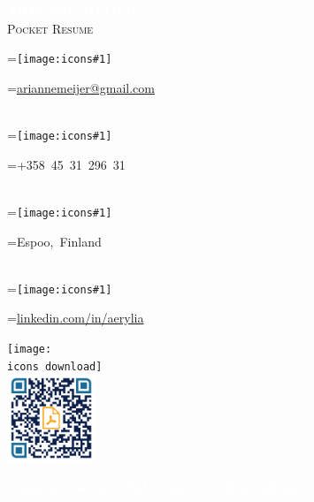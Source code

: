 \documentclass[8pt]{article}
\newcommand*{\vcenteredhbox}[1]{\begingroup
\setbox0=\hbox{#1}\parbox{\wd0}{\box0}\endgroup}
\newcommand{\icons}{Font-Awesome-SVG-PNG/}	%
\newcommand{\icon}[2]{\colorbox{secondcol}{\texttt{[image: \\icons\#1]}}}	%
\newcommand{\icontext}[4]{ 						%
	\vcenteredhbox{\icon{#1}{#2}}\hspace{#4} \vcenteredhbox{\textcolor{textcol}{#3}}
}
\begin{document}
\small
        \begin{flushleft}
            \colorbox{maincol}{\large{\textcolor{white}{\textbf{\uppercase{Arianne Meijer}}} }}\\
            \small{\textcolor{fourthcol}{\textsc{Pocket Resume}}}\\
            \end{flushleft}
            \vspace{-10pt}
            \parbox{0.6\textwidth}{
            \begin{flushleft}
            \small
			\icontext{at2}{10pt}{\href{mailto:ariannemeijer@gmail.com}{ariannemeijer@gmail.com} }{5pt}\\[-2pt]
			\icontext{mobile-phone2}{10pt}{+358 45 31 296 31}{5pt}\\[-2pt]
			\icontext{map-marker2}{10pt}{Espoo, Finland}{5pt}\\[-2pt]
			\icontext{linkedin-box2}{10pt}{\href{https://linkedin.com/in/aerylia}{linkedin.com/in/aerylia}}{5pt}
			\end{flushleft}
			}
			\parbox{0.4\textwidth}{
			\begin{center}
			\vspace{-20pt}
			\colorbox{fourthcol}{\texttt{[image: \\icons download]}\hspace{5pt} \textcolor{white}{Full resume}}\\
			\includegraphics[height=75pt]{qr-code2.pdf}
			\end{center}
			}
			\begin{center}
			\vspace{-10pt}
			\colorbox{thirdcol}{\hspace{3pt}\small{\textcolor{white}{\textbf{Computer Science PhD student, NISQ Software}}\hspace{2pt}}}
			\end{center}
\end{document}
